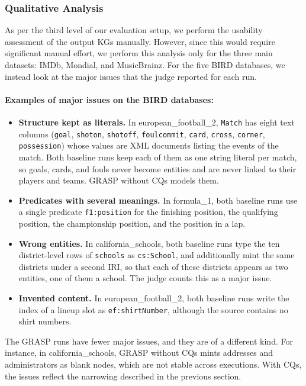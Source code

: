 \subsubsection{Qualitative Analysis}\label{sec:results-qualitative}

As per the third level of our evaluation setup, we perform the usability assessment of the output KGs manually. However, since this would require significant manual effort, we perform this analysis only for the three main datasets: IMDb, Mondial, and MusicBrainz. For the five BIRD databases, we instead look at the major issues that the judge reported for each run.

\paragraph{Examples of major issues on the BIRD databases:}
\begin{itemize}[leftmargin=*, itemsep=2pt]
  \item \textbf{Structure kept as literals.} In european\_football\_2, \texttt{Match} has eight text columns (\texttt{goal}, \texttt{shoton}, \texttt{shotoff}, \texttt{foulcommit}, \texttt{card}, \texttt{cross}, \texttt{corner}, \texttt{possession}) whose values are XML documents listing the events of the match. Both baseline runs keep each of them as one string literal per match, so goals, cards, and fouls never become entities and are never linked to their players and teams. GRASP without CQs models them.
  \item \textbf{Predicates with several meanings.} In formula\_1, both baseline runs use a single predicate \texttt{f1:position} for the finishing position, the qualifying position, the championship position, and the position in a lap.
  \item \textbf{Wrong entities.} In california\_schools, both baseline runs type the ten district-level rows of \texttt{schools} as \texttt{cs:School}, and additionally mint the same districts under a second IRI, so that each of these districts appears as two entities, one of them a school. The judge counts this as a major issue.
  \item \textbf{Invented content.} In european\_football\_2, both baseline runs write the index of a lineup slot as \texttt{ef:shirtNumber}, although the source contains no shirt numbers.
\end{itemize}
The GRASP runs have fewer major issues, and they are of a different kind. For instance, in california\_schools, GRASP without CQs mints addresses and administrators as blank nodes, which are not stable across executions. With CQs, the issues reflect the narrowing described in the previous section.

